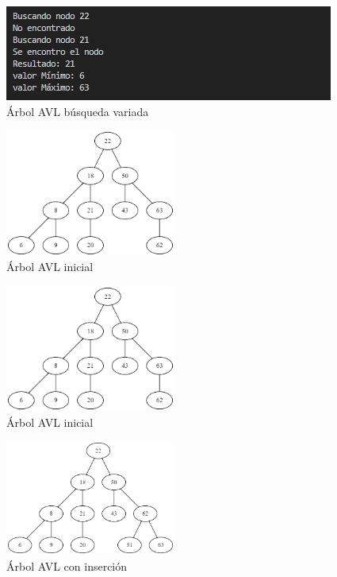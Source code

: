 \documentclass{article}
\begin{document}
         \begin{figure}[htbp]
              \centering
              \includegraphics[width=\textwidth]{img/busquedaAVL.png}
              \caption{Árbol AVL búsqueda variada}
              \label{fig:avlBusqueda}
            \end{figure}
            \begin{figure}[htbp]
              \centering
              \includegraphics[width=0.5\textwidth]{img/avltree.png}
              \caption{Árbol AVL inicial}
              \label{fig:avlInicial}
            \end{figure}
            \begin{figure}[htbp]
              \centering
              \includegraphics[width=0.5\textwidth]{img/avltree.png}
              \caption{Árbol AVL inicial}
              \label{fig:avlInicial}
            \end{figure}
            \begin{figure}[htbp]
              \centering
              \includegraphics[width=0.5\textwidth]{img/avltree-insertion.png}
              \caption{Árbol AVL con inserción }
                \label{fig:avlIsertion}
            \end{figure}
\end{document}
